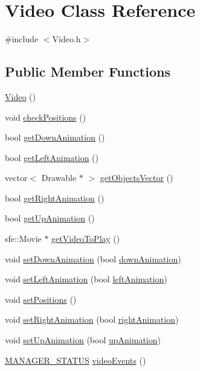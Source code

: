 \hypertarget{classVideo}{}\section{Video Class Reference}
\label{classVideo}


{\ttfamily \#include $<$Video.\+h$>$}

\subsection*{Public Member Functions}
\begin{DoxyCompactItemize}
\item 
\hyperlink{classVideo_ab67336c2c5b6227a9635bc7dcd6af543}{Video} ()
\item 
void \hyperlink{classVideo_a9e80e9a88fd5d80aeeda8df0804fa2e8}{check\+Positions} ()
\item 
bool \hyperlink{classVideo_ab93216910bfa303c707d85dcba691a32}{get\+Down\+Animation} ()
\item 
bool \hyperlink{classVideo_af805356652d8f08c41da1df0f3f5854d}{get\+Left\+Animation} ()
\item 
vector$<$ Drawable $\ast$ $>$ \hyperlink{classVideo_aeffa6c8901a81ba7ce15f63ff97dbfa8}{get\+Objects\+Vector} ()
\item 
bool \hyperlink{classVideo_ac31c5b728166d7cf7fe7f58d71dc50b1}{get\+Right\+Animation} ()
\item 
bool \hyperlink{classVideo_a1810b74d077a593c429211a2d374a51f}{get\+Up\+Animation} ()
\item 
sfe\+::\+Movie $\ast$ \hyperlink{classVideo_ab8e3fcb522e1e4be723a3ef05b315cb3}{get\+Video\+To\+Play} ()
\item 
void \hyperlink{classVideo_a3c882e87f594e4c89284f5e5a7093069}{set\+Down\+Animation} (bool \hyperlink{classVideo_aec0e8ade42cb0336539857309f1329ee}{down\+Animation})
\item 
void \hyperlink{classVideo_aed05b84331399a1e2d42dffdc25ca4d6}{set\+Left\+Animation} (bool \hyperlink{classVideo_a9cc3dcc22a6e20b9f1dbc6340386c5d0}{left\+Animation})
\item 
void \hyperlink{classVideo_ad9ec3de5d15bfb5dbaaad3f81157c2ab}{set\+Positions} ()
\item 
void \hyperlink{classVideo_a2c06363b8efa7c22811693cfec9630e6}{set\+Right\+Animation} (bool \hyperlink{classVideo_ab61a504587371180bb6533ed99e1a688}{right\+Animation})
\item 
void \hyperlink{classVideo_a9aea5a522a7ba84ccae1e946f6a6a41b}{set\+Up\+Animation} (bool \hyperlink{classVideo_a997f7ceb635d7897d2eed00cf6faaf19}{up\+Animation})
\item 
\hyperlink{Global_8h_a94049c48a0d77b80bca0fcb5b1281516}{M\+A\+N\+A\+G\+E\+R\+\_\+\+S\+T\+A\+T\+US} \hyperlink{classVideo_a732cb55c0a7f677ddf20ea0c39690ace}{video\+Events} ()
\end{DoxyCompactItemize}
